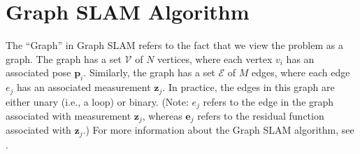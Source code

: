 \documentclass{article}
\begin{document}
\section{Graph SLAM Algorithm}

The ``Graph'' in Graph SLAM refers to the fact that we view the problem as a graph.  The graph has a set $\mathcal{V}$ of $N$ vertices, where each vertex $v_i$ has an associated pose $\mathbf{p}_i$.  Similarly, the graph has a set $\mathcal{E}$ of $M$ edges, where each edge $e_j$ has an associated measurement $\mathbf{z}_j$.  In practice, the edges in this graph are either unary (i.e., a loop) or binary.  (Note: $e_j$ refers to the edge in the graph associated with measurement $\mathbf{z}_j$, whereas $\mathbf{e}_j$ refers to the residual function associated with $\mathbf{z}_j$.)  For more information about the Graph SLAM algorithm, see \cite{grisetti2010tutorial}.
\end{document}
